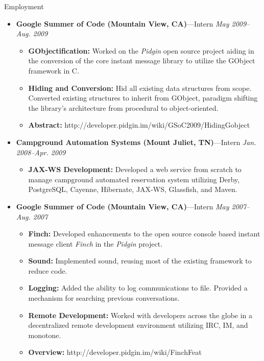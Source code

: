 \documentclass[11pt,oneside]{article}
\newenvironment{ressection}[1]{
	\vspace{4pt}
	{\fontfamily{phv}\selectfont\Large#1}
	\begin{itemize}
	\vspace{3pt}
}{
	\end{itemize}
}
\newcommand{\ressubitem}[1]{
	\vspace{-1pt}
	\item \begin{flushleft} #1 \end{flushleft}
}
\newcommand{\resbigitem}[3]{
	\vspace{-5pt}
	\item
	{\textbf{#1}---#2 \hfill \textit{#3}}
}
\newenvironment{restitledposition}[3]{
	\resbigitem{#1}{#2}{#3}
	\vspace{-2pt}
	\begin{itemize}
}{
	\end{itemize}
}
\begin{document}
\begin{ressection}{Employment}
	\begin{restitledposition}{Google Summer of Code (Mountain View, CA)}{Intern}{May 2009--Aug. 2009}

		\ressubitem{\textbf{GObjectification:} Worked on the \textit{Pidgin} open source project
		aiding in the conversion of the core instant message library to utilize the 
		GObject framework in C.}

		\ressubitem{\textbf{Hiding and Conversion:} Hid all existing data structures from scope.
		Converted existing structures to inherit from GObject, paradigm shifting the library's 
		architecture from procedural to object-oriented.}
		
		\ressubitem{\textbf{Abstract:} http://developer.pidgin.im/wiki/GSoC2009/HidingGobject}

	\end{restitledposition}

	\begin{restitledposition}{Campground Automation Systems (Mount Juliet, TN)}{Intern}{Jan. 2008--Apr. 2009}

    \ressubitem{\textbf{JAX-WS Development:} Developed a web service from scratch to
		manage campground automated reservation system utilizing Derby, PostgreSQL, 
		Cayenne, Hibernate, JAX-WS, Glassfish, and Maven.}
		
	\end{restitledposition}

	\begin{restitledposition}{Google Summer of Code (Mountain View, CA)}{Intern}{May 2007--Aug. 2007}

		\ressubitem{\textbf{Finch:} Developed enhancements to the open source console
		based instant message client \textit{Finch} in the \textit{Pidgin} project.}

		\ressubitem{\textbf{Sound:} Implemented sound, reusing most of the existing
		framework to reduce code.}

		\ressubitem{\textbf{Logging:} Added the ability to log communications to file. 
		Provided a mechanism for searching previous conversations.}

		\ressubitem{\textbf{Remote Development:} Worked with developers across the globe in
		a decentralized remote development environment utilizing IRC, IM, and monotone.}

		\ressubitem{\textbf{Overview:} http://developer.pidgin.im/wiki/FinchFeat}
		
	\end{restitledposition}


\end{ressection}
\end{document}
